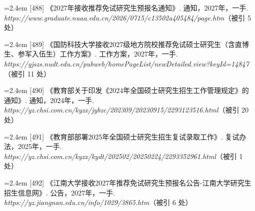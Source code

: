 {\vspace{0.6pt}
\vspace{3.5pt}\par
\nopagebreak\vspace{1pt}
\noindent\hangindent=2.4em \label{src:S0648}{\color{cAccent}[488]} 《2027年接收推荐免试研究生预报名通知》. 通知，2027年，一手. \textit{https://www.graduate.nuaa.edu.cn/2026/0715/c13502a405484/page.htm}（被引 5 处）\par
\vspace{0.6pt}
\vspace{3.5pt}\par
\nopagebreak\vspace{1pt}
\noindent\hangindent=2.4em \label{src:S0650}{\color{cAccent}[489]} 《国防科技大学接收2027级地方院校推荐免试硕士研究生（含直博生、参军入伍生）工作方案》. 工作方案，2027年，一手. \textit{https://yjszs.nudt.edu.cn/pubweb/homePageList/newDetailed.view?keyId=14847}（被引 11 处）\par
\vspace{0.6pt}
\vspace{3.5pt}\par
\nopagebreak\vspace{1pt}
\noindent\hangindent=2.4em \label{src:S0651}{\color{cAccent}[490]} 《教育部关于印发《2024年全国硕士研究生招生工作管理规定》的通知》. 通知，2024年，一手. \textit{https://yz.chsi.com.cn/kyzx/jybzc/202309/20230915/2293123516.html}（被引 20 处）\par
\vspace{0.6pt}
\noindent\hangindent=2.4em \label{src:S0652}{\color{cAccent}[491]} 《教育部部署2025年全国硕士研究生招生复试录取工作》. 复试办法，2025年，一手. \textit{https://yz.chsi.com.cn/kyzx/kydt/202502/20250224/2293352961.html}（被引 1 处）\par
\vspace{0.6pt}
\vspace{3.5pt}\par
\nopagebreak\vspace{1pt}
\noindent\hangindent=2.4em \label{src:S0655}{\color{cAccent}[492]} 《江南大学接收2027年推荐免试研究生预报名公告-江南大学研究生招生信息网》. 公告，2027年，一手. \textit{https://yz.jiangnan.edu.cn/info/1029/3865.htm}（被引 6 处）\par
}

